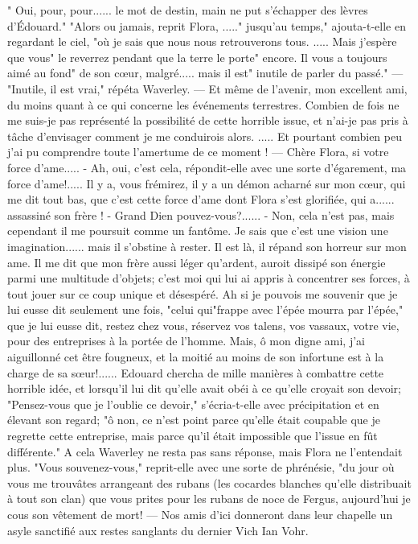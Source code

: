 {" Oui, pour, pour...... le mot de destin, main ne put s'échapper des lèvres d'Édouard."
"Alors ou jamais, reprit Flora, ....." jusqu'au temps," ajouta-t-elle en regardant le ciel, "où je sais que nous nous retrouverons tous. ..... Mais j'espère que vous" le reverrez pendant que la terre le porte" encore. Il vous a toujours aimé au fond" de son cœur, malgré..... mais il est" inutile de parler du passé."
— "Inutile, il est vrai," répéta Waverley.
— Et même de l'avenir, mon excellent ami, du moins quant à ce qui concerne les événements terrestres. Combien de fois ne me suis-je pas représenté la possibilité de cette horrible issue, et n'ai-je pas pris à tâche d'envisager comment je me conduirois alors. ..... Et pourtant combien peu j'ai pu comprendre toute l'amertume de ce moment !
— Chère Flora, si votre force d'ame.....\setcounter{page}{380} - Ah, oui, c'est cela, répondit-elle avec une sorte d'égarement, ma force d'ame!..... Il y a, vous frémirez, il y a un démon acharné sur mon cœur, qui me dit tout bas, que c'est cette force d'ame dont Flora s'est glorifiée, qui a...... assassiné son frère !
- Grand Dien pouvez-vous?......
- Non, cela n'est pas, mais cependant il me poursuit comme un fantôme. Je sais que c'est une vision une imagination...... mais il s'obstine à rester. Il est là, il répand son horreur sur mon ame. Il me dit que mon frère aussi léger qu'ardent, auroit dissipé son énergie parmi une multitude d'objets; c'est moi qui lui ai appris à concentrer ses forces, à tout jouer sur ce coup unique et désespéré. Ah si je pouvois me souvenir que je lui eusse dit seulement une fois, "celui qui"frappe avec l'épée mourra par l'épée," que je lui eusse dit, restez chez vous, réservez vos talens, vos vassaux, votre vie, pour des entreprises à la portée de l'homme. Mais, ô mon digne ami, j'ai aiguillonné cet être fougneux, et la moitié au moins de son infortune est à la charge de sa sœur!......
Edouard chercha de mille manières à combattre cette horrible idée, et lorsqu'il\setcounter{page}{381} lui dit qu'elle avait obéi à ce qu'elle croyait son devoir; "Pensez-vous que je l'oublie ce devoir," s'écria-t-elle avec précipitation et en élevant son regard; "ô non, ce n'est point parce qu'elle était coupable que je regrette cette entreprise, mais parce qu'il était impossible que l'issue en fût différente."
A cela Waverley ne resta pas sans réponse, mais Flora ne l'entendait plus.
"Vous souvenez-vous," reprit-elle avec une sorte de phrénésie, "du jour où vous me trouvâtes arrangeant des rubans (les cocardes blanches qu'elle distribuait à tout son clan) que vous prites pour les rubans de noce de Fergus, aujourd'hui je cous son vêtement de mort! — Nos amis d'ici donneront dans leur chapelle un asyle sanctifié aux restes sanglants du dernier Vich Ian Vohr.
}
